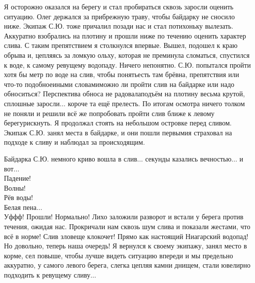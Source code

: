 Я осторожно оказался на берегу и стал пробираться сквозь заросли оценить ситуацию. Олег держался за прибрежную траву, чтобы байдарку не сносило ниже. Экипаж С.Ю. тоже причалил позади нас и стал потихоньку вылезать. Аккуратно взобрались на плотину и прошли ниже по течению оценить характер слива. С таким препятствием я столкнулся впервые. Вышел, подошел к краю обрыва и, цепляясь за ломкую ольху, которая не преминула сломаться, спустился к воде, к самому ревущему водопаду. Ничего непонятно. С.Ю. попытался пройти хотя бы метр по воде на слив, чтобы понять\mdash есть там брёвна, препятствия или что-то подобное\mdash иными словами\mdash можно ли пройти слив на байдарке или надо обноситься? Перспектива обноса не радовала\mdash подъём на плотину весьма крутой, сплошные заросли$\ldots$ короче та ещё прелесть. По итогам осмотра ничего толком не поняли и решили всё же попробовать пройти слив ближе к левому берегу\mdash рискнуть. Я продолжал стоять на небольшом островке перед сливом. Экипаж С.Ю. занял места в байдарке, и они пошли первыми\mdash я страховал на подходе к сливу и наблюдал за происходящим.

Байдарка С.Ю. немного криво вошла в слив$\ldots$ секунды казались вечностью$\ldots$ и вот$\ldots$\\
Падение!\\
\hspace*{15mm} Волны!\\
\hspace*{29mm} Рёв воды!\\
\hspace*{47mm} Белая пена$\ldots$\\
\noindent Уф\sdash ф\sdash ф! Прошли! Нормально! Лихо заложили разворот и встали у берега против течения, ожидая нас. Прокричали нам сквозь шум слива и показали жестами, что всё в норме! Слив зловеще клокочет! Прямо как настоящий Ниагарский водопад! Но довольно, теперь наша очередь! Я вернулся к своему экипажу, занял место в корме, сел повыше, чтобы лучше видеть ситуацию впереди и мы предельно аккуратно, у самого левого берега, слегка цепляя камни днищем, стали ювелирно подходить к ревущему сливу$\ldots$
 
